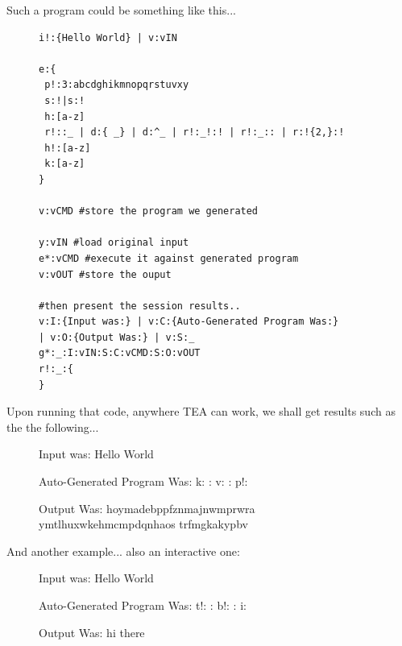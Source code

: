 \documentclass[a4paper, 18pt]{book} %
\begin{document}
\vspace{1em}

Such a program could be something like this...


 \begin{figure}[H]
 \Large
  \centering
  \begin{tcolorbox}[teaterminalstyle, title=TEA Program: SELF-MODIFYING HELLO WORLD]
  \begin{lstlisting}[language=TEA]
i!:{Hello World} | v:vIN

e:{
 p!:3:abcdghikmnopqrstuvxy
 s:!|s:!
 h:[a-z]
 r!::_ | d:{ _} | d:^_ | r!:_!:! | r!:_:: | r:!{2,}:!
 h!:[a-z]
 k:[a-z]
}

v:vCMD #store the program we generated

y:vIN #load original input
e*:vCMD #execute it against generated program
v:vOUT #store the ouput

#then present the session results..
v:I:{Input was:} | v:C:{Auto-Generated Program Was:} 
| v:O:{Output Was:} | v:S:_
g*:_:I:vIN:S:C:vCMD:S:O:vOUT
r!:_:{
}
   \end{lstlisting}
  \end{tcolorbox}
  \label{FIGD}
\end{figure}


Upon running that code, anywhere TEA can work, we shall get results such as the the following...


\begin{figure}[H]
  \centering
  \begin{tcbverbatim}[title=Sample Session of Self-Modifying TEA Hello World]
Input was:
Hello World


Auto-Generated Program Was:
k: :
v: :
p!:


Output Was:
hoymadebppfznmajnwmprwra ymtlhuxwkehmcmpdqnhaos trfmgkakypbv
  \end{tcbverbatim}
\end{figure}


And another example... also an interactive one:


\begin{figure}[H]
  \centering
  \begin{tcbverbatim}[title=Sample Session of Self-Modifying TEA Hello World]
Input was:
Hello World


Auto-Generated Program Was:
t!: :
b!: :
i:


Output Was:
hi there
  \end{tcbverbatim}
\end{figure}
\end{document}
